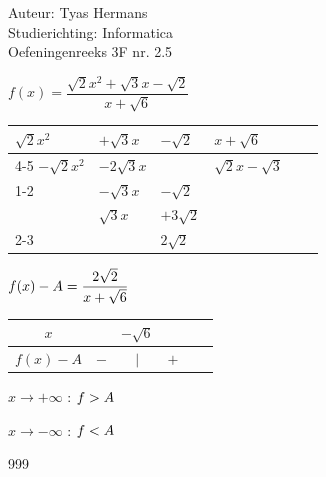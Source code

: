 \documentclass[a4paper]{article}
\begin{document}
  
\noindent \large Auteur: Tyas Hermans \\
\noindent \large Studierichting: Informatica\\
\noindent \large Oefeningenreeks 3F nr. 2.5\\

\medskip

\normalsize

$ f(x) = \dfrac{\sqrt{2}x^2 + \sqrt{3}x - \sqrt{2}}{x + \sqrt{6}}                                  $\\

\bigskip

\begin{tabular}{lll|lll}
$ \sqrt{2}x^2  $  & $ + \sqrt{3}x $   & $ -\sqrt{2} $   & $ x + \sqrt{6} $         &   \\ \cline{4-5}
$ -\sqrt{2}x^2 $  & $ - 2\sqrt{3}x $  & 			          & $ \sqrt{2}x - \sqrt{3} $ &   \\ \cline{1-2}
				          & $ -\sqrt{3}x $    & $ -\sqrt{2} $	  &			                     &   \\
				          & $  \sqrt{3}x $    & $ +3\sqrt{2} $	&			                     &   \\ \cline{2-3}
				          &                   & $  2\sqrt{2} $	&			                     &   \\ 
\end{tabular}

\bigskip

$ f(x) - A = \dfrac{2\sqrt{2}}{x + \sqrt{6}}             \\$

\bigskip

\begin{tabular}{c|ccccc}
$x$				 &       & 	$ -\sqrt{6} $   &     & \\ \hline
$f(x) - A$ &  $-$  &  $|$   						& $+$ & \\
\end{tabular}

\bigskip

$ x \rightarrow +\infty $ : $ f > A \\$ 

$ x \rightarrow -\infty $ : $ f < A \\$

\begin{thebibliography}{999}
\end{thebibliography}
\end{document}
